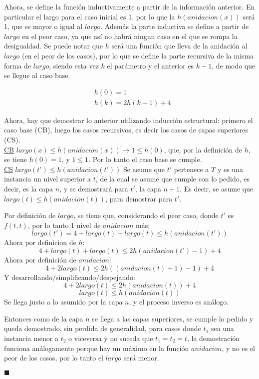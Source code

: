 \documentclass[letter]{article}
\begin{document}
\begin{pregunta}{1}
\begin{enumerate}
		Ahora, se define la función inductivamente a partir de la información anterior. En particular el largo para el caso inicial es 1, por lo que la $h(anidacion(x))$ será 1, que es mayor o igual al $largo$. Además la parte inductiva se define a partir de $largo$ en el peor caso, ya que así no habrá ningun caso en el que se rompa la desigualdad. Se puede notar que $h$ será una función que lleva de la anidación al $largo$ (en el peor de los casos), por lo que se define la parte recursiva de la misma forma de $largo$, siendo esta vez $k$ el parámetro y el anterior es $k-1$, de modo que se llegue al caso base.
		
		\begin{align*}
			& h(0) = 1\\
			& h(k) = 2h(k-1) + 4
		\end{align*}		 
		
		Ahora, hay que demostrar lo anterior utilizando inducción estructural: primero el caso base (CB), luego los casos recursivos, es decir los casos de capas superiores (CS).\\
		
		\underline{CB} $largo(x) \le h(anidacion(x)) \rightarrow 1 \le h(0)$, que, por la definición de $h$, se tiene $h(0)=1$, y $1\le 1$. Por lo tanto el caso base se cumple.\\
		
		\underline{CS} $largo(t') \le h(anidacion(t'))$
		Se asume que $t'$ pertenece a $T$ y es una instancia un nivel superior a $t$, de la cual se asume que cumple con lo pedido, es decir, es la capa $n$, y se demostrará para $t'$, la capa $n+1$. Es decir, se asume que $largo(t) \le h(anidacion(t))$, para demostrar para $t'$.
		
		Por definición de $largo$, se tiene que, considerando el peor caso, donde $t'$ es $f(t,t)$, por lo tanto 1 nivel de $anidacion$ más:
		$$largo(t') = 4 + largo(t) + largo(t) \le h(anidacion(t'))$$
		Ahora por definicion de $h$:
		$$4 + largo(t) + largo(t) \le 2h(anidacion(t')-1) + 4$$
		Ahora por definición de $anidacion$:
		$$4 + 2largo(t) \le 2h((anidacion(t)+1)-1) + 4$$
		Y desarrollando/simplificando/despejando:
		$$4 + 2largo(t) \le 2h(anidacion(t)) + 4$$
		$$largo(t) \le h(anidacion(t))$$
		Se llega justo a lo asumido por la capa $n$, y el proceso inverso es análogo.
		
		Entonces como de la capa $n$ se llega a las capas superiores, se cumple lo pedido y queda demostrado, sin perdida de generalidad, para casos donde $t_1$ sea una instancia menor a $t_2$ o viceversa y no suceda que $t_1=t_2=t$, la demostración funciona análogamente porque hay un máximo en la función $anidacion$, y no es el peor de los casos, por lo tanto el $largo$ será menor.
		\begin{flushright}$\blacksquare$\end{flushright}
		\end{enumerate}
	\end{pregunta}
\end{document}
